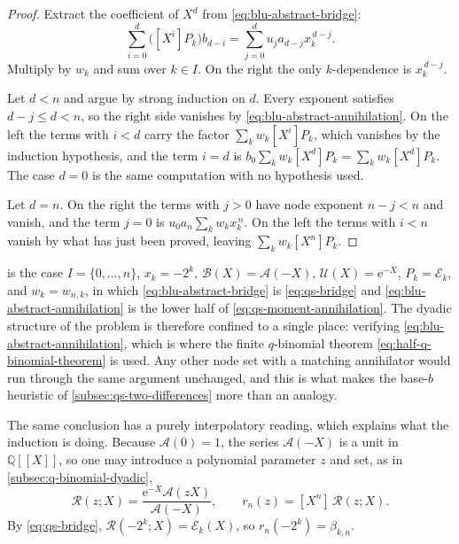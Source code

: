 \documentclass[11pt,oneside]{article}
\theoremstyle{definition}
\theoremstyle{remark}
\newcommand{\Q}{\mathbb Q}
\newcommand{\e}{\mathrm e}
\begin{document}
\begin{proof}
Extract the coefficient of $X^d$ from \eqref{eq:blu-abstract-bridge}:
\begin{equation*}
 \sum_{i=0}^{d}\bigl([X^i]P_k\bigr)b_{d-i}
 =\sum_{j=0}^{d}u_ja_{d-j}x_k^{\,d-j}.
\end{equation*}
Multiply by $w_k$ and sum over $k\in I$.  On the right the only $k$-dependence is
$x_k^{\,d-j}$.

Let $d<n$ and argue by strong induction on $d$.  Every exponent satisfies $d-j\le d<n$, so
the right side vanishes by \eqref{eq:blu-abstract-annihilation}.  On the left the terms with
$i<d$ carry the factor $\sum_kw_k[X^i]P_k$, which vanishes by the induction hypothesis, and
the term $i=d$ is $b_0\sum_kw_k[X^d]P_k=\sum_kw_k[X^d]P_k$.  The case $d=0$ is the same
computation with no hypothesis used.

Let $d=n$.  On the right the terms with $j>0$ have node exponent $n-j<n$ and vanish, and the
term $j=0$ is $u_0a_n\sum_kw_kx_k^{\,n}$.  On the left the terms with $i<n$ vanish by what
has just been proved, leaving $\sum_kw_k[X^n]P_k$.
\end{proof}

 is the case $I=\{0,\ldots,n\}$, $x_k=-2^k$,
$\mathscr B(X)=\mathscr A(-X)$, $\mathscr U(X)=\e^{-X}$, $P_k=\mathscr E_k$, and
$w_k=w_{n,k}$, in which \eqref{eq:blu-abstract-bridge} is \eqref{eq:qs-bridge} and
\eqref{eq:blu-abstract-annihilation} is the lower half of \eqref{eq:qs-moment-annihilation}.
The dyadic structure of the problem is therefore confined to a single place: verifying
\eqref{eq:blu-abstract-annihilation}, which is where the finite $q$-binomial theorem
\eqref{eq:half-q-binomial-theorem} is used.  Any other node set with a matching annihilator
would run through the same argument unchanged, and this is what makes the base-$b$ heuristic
of \cref{subsec:qs-two-differences} more than an analogy.

The same conclusion has a purely interpolatory reading, which explains what the induction is
doing.  Because $\mathscr A(0)=1$, the series $\mathscr A(-X)$ is a unit in $\Q[[X]]$, so one
may introduce a polynomial parameter $z$ and set, as in \cref{subsec:q-binomial-dyadic},
\begin{equation}
 \mathscr R(z;X)=\frac{\e^{-X}\mathscr A(zX)}{\mathscr A(-X)},
 \qquad
 r_n(z)=[X^n]\,\mathscr R(z;X).                            \label{eq:qs-R-and-rn}
\end{equation}
By \eqref{eq:qs-bridge}, $\mathscr R(-2^k;X)=\mathscr E_k(X)$, so $r_n(-2^k)=\beta_{k,n}$.
\end{document}
